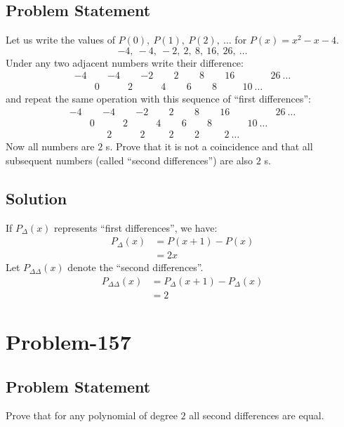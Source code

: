 \documentclass[12pt]{article}
\begin{document}
\subsection*{Problem Statement}
Let us write the values of $P(0),\ P(1),\ P(2),\ \ldots$ for $P(x) = x^2-x-4$.
\[
	-4,\ -4,\ -2,\ 2,\ 8,\ 16,\ 26,\ \ldots
\]
Under any two adjacent numbers write their difference:
\[
\begin{array}{lllllllllllll}
	-4 &   & -4 &   & -2 &   & 2 &   & 8 &   & 16 &    & 26\ \ldots\\
	   & 0 &    & 2 &    & 4 &   & 6 &   & 8 &    & 10\ \ldots &
\end{array}
\]
and repeat the same operation with this sequence of ``first differences'':
\[
\begin{array}{lllllllllllll}
	-4 &   & -4 &   & -2 &   & 2 &   & 8 &   & 16 &    & 26\ \dots\\
	   & 0 &    & 2 &    & 4 &   & 6 &   & 8 &    & 10\ \ldots &   \\
	   &   & \ \ 2 &   &\ \ 2 &   & 2 &   & 2 &   &\ \ 2\ \ldots &    &
\end{array}
\]
Now all numbers are $2$ s. Prove that it is not a coincidence and that all subsequent numbers (called ``second differences'') are also $2$ s.
\subsection*{Solution}
If $P_{\Delta}(x)$ represents ``first differences'', we have:
\begin{equation*}
	\begin{aligned}
		P_{\Delta}(x) &= P(x+1)-P(x)\\
					  &= 2x
	\end{aligned}
\end{equation*}
Let $P_{\Delta \Delta}(x)$ denote the ``second differences''.
\begin{equation*}
	\begin{aligned}
		P_{\Delta \Delta}(x) &= P_{\Delta}(x+1)-P_{\Delta}(x)\\
		                  &= 2
	\end{aligned}
\end{equation*}

\section*{Problem-157}
\subsection*{Problem Statement}
Prove that for any polynomial of degree $2$ all second differences are equal.
\end{document}

